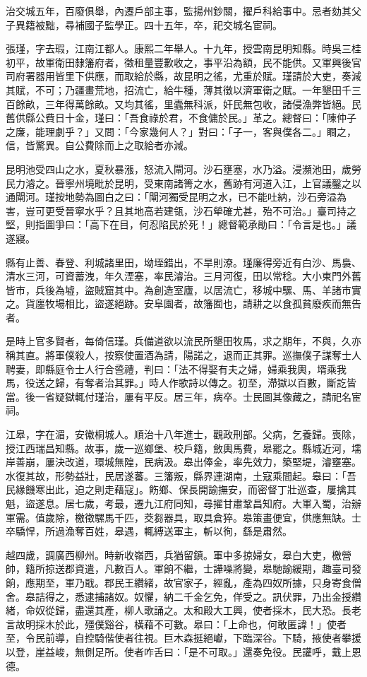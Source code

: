 \begin{pinyinscope}
治交城五年，百廢俱舉，內遷戶部主事，監揚州鈔關，擢戶科給事中。忌者劾其父子異籍被黜，尋補國子監學正。四十五年，卒，祀交城名宦祠。

張瑾，字去瑕，江南江都人。康熙二年舉人。十九年，授雲南昆明知縣。時吳三桂初平，故軍衛田隸籓府者，徵租量豐歉收之，事平沿為額，民不能供。又軍興後官司府署器用皆里下供應，而取給於縣，故昆明之徭，尤重於賦。瑾請於大吏，奏減其賦，不可；乃疆畫荒地，招流亡，給牛種，薄其徵以濟軍衛之賦。一年墾田千三百餘畝，三年得萬餘畝。又均其徭，里蠹無科派，奸民無包收，諸侵漁弊皆絕。民舊供縣公費日十金，瑾曰：「吾食祿於君，不食傭於民。」革之。總督曰：「陳仲子之廉，能理劇乎？」又問：「今家幾何人？」對曰：「子一，客與僕各二。」瞷之，信，皆驚異。自公費除而上之取給者亦減。

昆明池受四山之水，夏秋暴漲，怒流入閘河。沙石壅塞，水乃溢。浸瀕池田，歲勞民力濬之。晉寧州境毗於昆明，受東南諸箐之水，舊跡有河道入江，上官議鑿之以通閘河。瑾按地勢為圖白之曰：「閘河獨受昆明之水，已不能吐納，沙石旁溢為害，豈可更受晉寧水乎？且其地高若建瓴，沙石犖確尤甚，殆不可治。」臺司持之堅，則指圖爭曰：「高下在目，何忍陷民於死！」總督範承勛曰：「令言是也。」議遂寢。

縣有止善、春登、利城諸里田，坳垤錯出，不旱則潦。瑾廉得旁近有白沙、馬裊、清水三河，可資蓄洩，年久湮塞，率民濬治。三月河復，田以常稔。大小東門外舊皆市，兵後為墟，盜賊窟其中。為創造室廬，以居流亡，移城中騾、馬、羊諸市實之。貨廛牧場相比，盜遂絕跡。安阜園者，故籓囿也，請耕之以食孤貧廢疾而無告者。

是時上官多賢者，每倚信瑾。兵備道欲以流民所墾田牧馬，求之期年，不與，久亦稱其直。將軍僕殺人，按察使置酒為請，陽諾之，退而正其罪。巡撫僕子謀奪士人聘妻，即縣庭令士人行合巹禮，判曰：「法不得娶有夫之婦，婦乘我輿，壻乘我馬，役送之歸，有奪者治其罪。」時人作歌詩以傳之。初至，滯獄以百數，斷訖皆當。後一省疑獄輒付瑾治，屢有平反。居三年，病卒。士民圖其像藏之，請祀名宦祠。

江皋，字在湄，安徽桐城人。順治十八年進士，觀政刑部。父病，乞養歸。喪除，授江西瑞昌知縣。故事，歲一巡鄉堡、校戶籍，斂輿馬費，皋罷之。縣城近河，壖岸善崩，屢決改道，環城無隍，民病汲。皋出俸金，率先效力，築堅堤，濬壅塞。水復其故，形勢益壯，民居遂蕃。三籓叛，縣界連湖南，土寇乘間起。皋曰：「吾民緣饑寒出此，迫之則走藉寇」。飭鄉、保長開諭撫安，而密督丁壯巡查，屢擒其魁，盜遂息。居七歲，考最，遷九江府同知，尋擢甘肅鞏昌知府。大軍入蜀，治辦軍需。值歲除，檄徵騾馬千匹，茭芻器具，取具倉猝。皋策畫便宜，供應無缺。士卒驕悍，所過漁奪百姓，皋遇，輒縛送軍主，斬以徇，繇是肅然。

越四歲，調廣西柳州。時新收嶺西，兵猶留鎮。軍中多掠婦女，皋白大吏，檄營帥，籍所掠送郡資遣，凡數百人。軍餉不繼，士譁噪將變，皋馳諭緩期，趣臺司發餉，應期至，軍乃戢。郡民王纘緒，故官家子，經亂，產為四奴所據，只身寄食僧舍。皋詰得之，悉逮捕諸奴。奴懼，納二千金乞免，佯受之。訊伏罪，乃出金授纘緒，命奴從歸，盡還其產，柳人歌誦之。太和殿大工興，使者採木，民大恐。長老言故明採木於此，殭僕谿谷，橫藉不可數。皋曰：「上命也，何敢匿諱！」使者至，令民前導，自控騎偕使者往視。巨木森挺絕巘，下臨深谷。下騎，掖使者攀援以登，崖益峻，無側足所。使者咋舌曰：「是不可取。」還奏免役。民讙呼，戴上恩德。


\end{pinyinscope}
